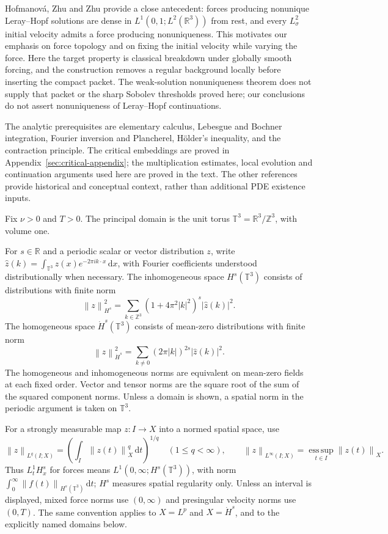 \documentclass[11pt,a4paper]{article}
\theoremstyle{definition}\newtheorem{definition}[theorem]{Definition}
\theoremstyle{remark}\newtheorem{remark}[theorem]{Remark}
\newcommand{\R}{\mathbb R}\newcommand{\TT}{\mathbb T^3}
\newcommand{\dd}{\,\mathrm d}\newcommand{\eps}{\varepsilon}
\newcommand{\norm}[1]{\left\lVert#1\right\rVert}
\begin{document}
Hofmanov\'a, Zhu and Zhu \cite[Theorem~1.4, Corollary~4.6 and Theorem~5.1]{hzz2024} provide a close antecedent: forces producing nonunique Leray--Hopf solutions are dense in $L^1(0,1;L^2(\R^3))$ from rest, and every $L^2_\sigma$ initial velocity admits a force producing nonuniqueness. This motivates our emphasis on force topology and on fixing the initial velocity while varying the force. Here the target property is classical breakdown under globally smooth forcing, and the construction removes a regular background locally before inserting the compact packet. The weak-solution nonuniqueness theorem does not supply that packet or the sharp Sobolev thresholds proved here; our conclusions do not assert nonuniqueness of Leray--Hopf continuations.

The analytic prerequisites are elementary calculus, Lebesgue and Bochner integration, Fourier inversion and Plancherel, H\"older's inequality, and the contraction principle. The critical embeddings are proved in Appendix~\ref{sec:critical-appendix}; the multiplication estimates, local evolution and continuation arguments used here are proved in the text. The other references provide historical and conceptual context, rather than additional PDE existence inputs.

Fix $\nu>0$ and $T>0$. The principal domain is the unit torus
$\TT=\R^3/\mathbb Z^3$, with volume one.

For $s\in\R$ and a periodic scalar or vector distribution $z$, write
$\widehat z(k)=\int_{\TT}z(x)e^{-2\pi i k\cdot x}\dd x$, with Fourier coefficients understood distributionally when necessary. The inhomogeneous space $H^s(\TT)$ consists of distributions with finite norm
\[
 \norm{z}_{H^s}^2
 =\sum_{k\in\mathbb Z^3}(1+4\pi^2|k|^2)^s|\widehat z(k)|^2.
\]
The homogeneous space $\dot H^s(\TT)$ consists of mean-zero distributions with finite norm
\[
 \norm{z}_{\dot H^s}^2
 =\sum_{k\ne0}(2\pi|k|)^{2s}|\widehat z(k)|^2.
\]
The homogeneous and inhomogeneous norms are equivalent on mean-zero fields at each fixed order. Vector and tensor norms are the square root of the sum of the squared component norms. Unless a domain is shown, a spatial norm in the periodic argument is taken on $\TT$.

For a strongly measurable map $z:I\to X$ into a normed spatial space, use
\begin{equation}\label{eq:time-norms}
 \norm{z}_{L^q(I;X)}=
 \left(\int_I\norm{z(t)}_X^q\dd t\right)^{1/q}\quad(1\le q<\infty),
 \qquad
 \norm{z}_{L^\infty(I;X)}=\operatorname*{ess\,sup}_{t\in I}\norm{z(t)}_X.
\end{equation}
Thus $L^1_tH^s_x$ for forces means $L^1(0,\infty;H^s(\TT))$, with norm
$\int_0^\infty\norm{f(t)}_{H^s(\TT)}\dd t$; $H^s$ measures spatial regularity only.
Unless an interval is displayed, mixed force norms use $(0,\infty)$ and
presingular velocity norms use $(0,T)$. The same convention applies to
$X=L^p$ and $X=\dot H^s$, and to the explicitly named domains below.
\end{document}
